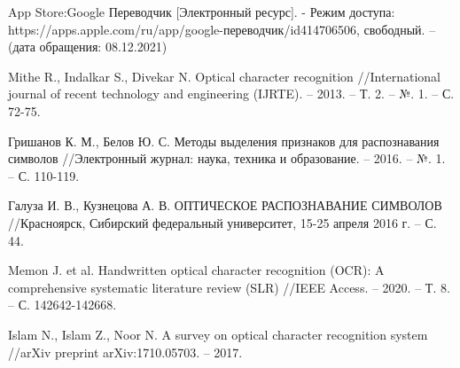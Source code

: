 \begin{thebibliography}{}
	App Store:Google Переводчик [Электронный ресурс]. - Режим доступа: https://apps.apple.com/ru/app/google-переводчик/id414706506, свободный. – (дата обращения: 08.12.2021)
	
	Mithe R., Indalkar S., Divekar N. Optical character recognition //International journal of recent technology and engineering (IJRTE). – 2013. – Т. 2. – №. 1. – С. 72-75.
	
	Гришанов К. М., Белов Ю. С. Методы выделения признаков для распознавания символов //Электронный журнал: наука, техника и образование. – 2016. – №. 1. – С. 110-119.
	
	Галуза И. В., Кузнецова А. В. ОПТИЧЕСКОЕ РАСПОЗНАВАНИЕ СИМВОЛОВ //Красноярск, Сибирский федеральный университет, 15-25 апреля 2016 г. – С. 44.
	
	Memon J. et al. Handwritten optical character recognition (OCR): A comprehensive systematic literature review (SLR) //IEEE Access. – 2020. – Т. 8. – С. 142642-142668.
	
	Islam N., Islam Z., Noor N. A survey on optical character recognition system //arXiv preprint arXiv:1710.05703. – 2017.
\end{thebibliography}
\endgroup

\pagebreak